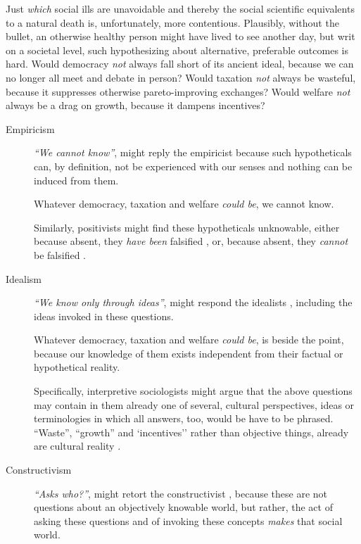 Just \emph{which} social ills are unavoidable and thereby the social scientific equivalents to a natural death is, unfortunately, more contentious.
Plausibly, without the bullet, an otherwise healthy person might have lived to see another day, but writ on a societal level, such hypothesizing about alternative, preferable outcomes is hard.
Would democracy \emph{not} always fall short of its ancient ideal, because we can no longer all meet and debate in person?
Would taxation \emph{not} always be wasteful, because it suppresses otherwise pareto-improving exchanges?
Would welfare \emph{not} always be a drag on growth, because it dampens incentives?

\begin{description}
	\item[Empiricism \label{itm:empiricism}]
	\emph{``We cannot know''}, might reply the empiricist \citep{Bacon1620,Locke1689,Hume1739} because such hypotheticals can, by definition, not be experienced with our senses and nothing can be induced from them. %

	Whatever democracy, taxation and welfare \emph{could be}, we cannot know.

	Similarly, positivists might find these hypotheticals unknowable, either because absent, they \emph{have been} falsified \citep{Comte1842,Durkheim1895}, or, because absent, they \emph{cannot} be falsified \citep{Popper1934}.

	\item[Idealism  \label{itm:idealism}]
	\emph{``We know only through ideas''}, might respond the idealists \citep[broadly][]{Kant1781,Hegel1807}, including the ideas invoked in these questions.

	Whatever democracy, taxation and welfare \emph{could be}, is beside the point, because our knowledge of them exists independent from their factual or hypothetical reality.

	Specifically, interpretive sociologists \citep{Weber1897} might argue that the above questions may contain in them already one of several, cultural perspectives, ideas or terminologies in which all answers, too, would be have to be phrased.
	``Waste'', ``growth'' and `incentives'' rather than objective things, already are cultural reality \citep[compare][]{Beland2010}.

	\item[Constructivism  \label{itm:constructivism}]
	\emph{``Asks \emph{who}?''}, might retort the constructivist \citep{Berger1966,Paul1984}, because these are not questions about an objectively knowable world, but rather, the act of asking these questions and of invoking these concepts \emph{makes} that social world.


\end{description}
